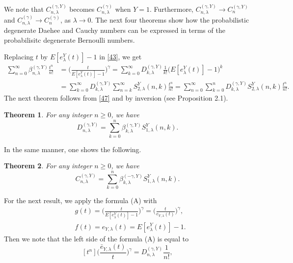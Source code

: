 \documentclass[a4paper,11pt]{amsart}
\newtheorem{theorem}{Theorem}[section]
\begin{document}
We note that $C_{n,\lambda}^{(\gamma,Y)}$ becomes $C_{n,\lambda}^{(\gamma)}$ when $Y=1$. Furthermore, $C_{n,\lambda}^{(\gamma,Y)} \rightarrow C_{n}^{(\gamma,Y)}$ and $C_{n,\lambda}^{(\gamma)} \rightarrow C_{n}^{(\gamma)}$, as $\lambda \rightarrow 0$.
The next four theorems show how the probabilistic degenerate Daehee and Cauchy numbers can be expressed in terms of the probabilisitc degenerate Bernoulli numbers.\par
Replacing $t$ by $E[e_{\lambda}^{Y}(t)]-1$ in \eqref{43}, we get
\begin{equation}
\begin{aligned} \label{47}
\sum_{n=0}^{\infty}\beta_{n,\lambda}^{(\gamma,Y)}\frac{t^{n}}{n!}&=\Big(\frac{t}{E[e_{\lambda}^{Y}(t)]-1}\Big)^{\gamma}=\sum_{k=0}^{\infty}D_{k,\lambda}^{(\gamma,Y)}\frac{1}{k!}\big(E[e_{\lambda}^{Y}(t)]-1\big)^{k} \\
&=\sum_{k=0}^{\infty}D_{k,\lambda}^{(\gamma,Y)}\sum_{n=k}^{\infty}S_{2,\lambda}^{Y}(n,k)\frac{t^{n}}{n!}=\sum_{n=0}^{\infty}\sum_{k=0}^{n}D_{k,\lambda}^{(\gamma,Y)}S_{2,\lambda}^{Y}(n,k) \frac{t^{n}}{n!}.
\end{aligned}
\end{equation}
The next theorem follows from \eqref{47} and by inversion (see Proposition 2.1).
\begin{theorem}
For any integer $n \ge 0$, we have
\begin{equation*}
D_{n,\lambda}^{(\gamma,Y)}=\sum_{k=0}^{n}\beta_{k,\lambda}^{(\gamma,Y)}S_{1,\lambda}^{Y}(n,k).
\end{equation*}
\end{theorem}
In the same manner, one shows the following.
\begin{theorem}
For any integer $n \ge 0$, we have
\begin{equation*}
C_{n,\lambda}^{(\gamma,Y)}=\sum_{k=0}^{n}\beta_{k,\lambda}^{(-\gamma,Y)}S_{1,\lambda}^{Y}(n,k).
\end{equation*}
\end{theorem}
For the next result, we apply the formula (A) with 
\begin{align*}
&g(t)=\bigg(\frac{t}{E[e_{\lambda}^{Y}(t)]-1}\bigg)^{\gamma}=\Big(\frac{t}{e_{Y,\lambda}(t)}\Big)^{\gamma}, \\
&f(t)=e_{Y,\lambda}(t)=E[e_{\lambda}^{Y}(t)]-1.
\end{align*}
Then we note that the left side of the formula (A) is equal to
\begin{equation} \label{48}
[t^{n}]\Big(\frac{\bar{e}_{Y,\lambda}(t)}{t}\Big)^{\gamma}=D_{n,\lambda}^{(\gamma,Y)}\frac{1}{n!},
\end{equation}
\end{document}
